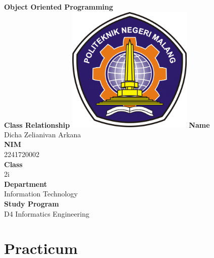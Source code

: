 \documentclass[12pt,titlepage]{article}
\newcommand{\vSubject}{Object Oriented Programming}
\newcommand{\vSubtitle}{Class Relationship}
\newcommand{\vName}{Dicha Zelianivan Arkana}
\newcommand{\vNIM}{2241720002}
\newcommand{\vClass}{2i}
\newcommand{\vDepartment}{Information Technology}
\newcommand{\vStudyProgram}{D4 Informatics Engineering}
\begin{document}
\begin{titlepage}
    \centering
    \vfill
    {\bfseries\LARGE
        \vSubject\\
        \vskip0.25cm
        \vSubtitle
    }
    \vfill
    \includegraphics[width=6cm]{images/polinema-logo.png}
    \vfill
    {
        \textbf{Name}\\
        \vName\\
        \vskip0.5cm
        \textbf{NIM}\\
        \vNIM\\
        \vskip0.5cm
        \textbf{Class}\\
        \vClass\\
        \vskip0.5cm
        \textbf{Department}\\
        \vDepartment\\
        \vskip0.5cm
        \textbf{Study Program}\\
        \vStudyProgram
    }
\end{titlepage}

\section{Practicum}
\end{document}
